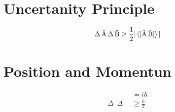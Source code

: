 \documentclass[10pt,a4paper]{book}
\DeclareMathOperator {\opA} {\hat{A}}
\DeclareMathOperator {\opB} {\hat{B}}
\DeclareMathOperator {\opPos} {\hat{x}}
\DeclareMathOperator {\opMom} {\hat{p}}
\begin{document}
\section{Uncertanity Principle}
\begin{align}
	\Delta\opA\Delta\opB \geq \frac{1}{2}|\braket{[\opA\opB]}|
\end{align}
\section{Position and Momentun}
\begin{align}
	[\opPos,\opMom] &= i\hbar \\
	\Delta\opPos\Delta\opMom &\geq \frac{\hbar}{2}
\end{align}
\end{document}
